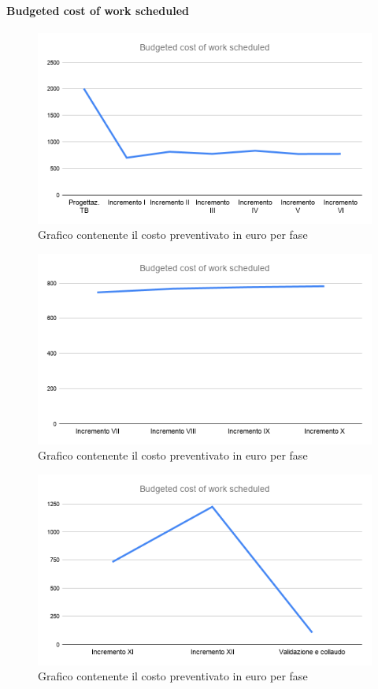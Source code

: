 	\paragraph{Budgeted cost of work scheduled}
		\begin{figure}[H]
			\centering
			\includegraphics[width=0.8\linewidth]{./res/images/BCWS_1.png}
			\caption{Grafico contenente il costo preventivato in euro per fase}
			\label{fig:Grafico contenente il costo preventivato in euro per fase}
		\end{figure}
		\begin{figure}[H]
			\centering
			\includegraphics[width=0.8\linewidth]{./res/images/BCWS_2.png}
			\caption{Grafico contenente il costo preventivato in euro per fase}
			\label{fig:Grafico contenente il costo preventivato in euro per fase}
		\end{figure}
		\begin{figure}[H]
			\centering
			\includegraphics[width=0.8\linewidth]{./res/images/BCWS_3.png}
			\caption{Grafico contenente il costo preventivato in euro per fase}
			\label{fig:Grafico contenente il costo preventivato in euro per fase}
		\end{figure}

